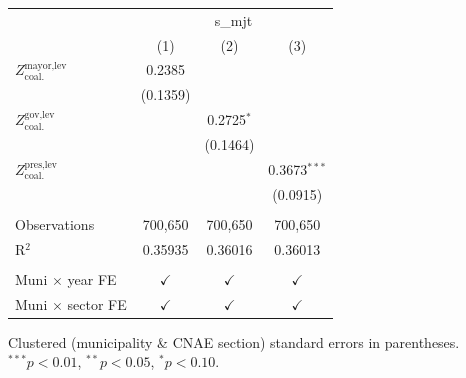 \begingroup
\centering
\begin{tabular}{lccc}
   \toprule
    & \multicolumn{3}{c}{s\_mjt}\\
                                           & (1)           & (2)           & (3)\\  
   \midrule 
   $Z^{\text{mayor,lev}}_{\text{coal.}}$   & 0.2385        &               &   \\   
                                           & (0.1359)      &               &   \\   
   $Z^{\text{gov,lev}}_{\text{coal.}}$     &               & 0.2725$^{*}$  &   \\   
                                           &               & (0.1464)      &   \\   
   $Z^{\text{pres,lev}}_{\text{coal.}}$    &               &               & 0.3673$^{***}$\\   
                                           &               &               & (0.0915)\\   
    \\
   Observations                            & 700,650       & 700,650       & 700,650\\  
   R$^2$                                   & 0.35935       & 0.36016       & 0.36013\\  
    \\
   Muni $\times$ year FE                   & $\checkmark$  & $\checkmark$  & $\checkmark$\\   
   Muni $\times$ sector FE                 & $\checkmark$  & $\checkmark$  & $\checkmark$\\   
   \bottomrule
\end{tabular}
 
\par \raggedright 
Clustered (municipality \& CNAE section) standard errors in parentheses. $^{***}p<0.01$, $^{**}p<0.05$, $^{*}p<0.10$.
\par\endgroup
